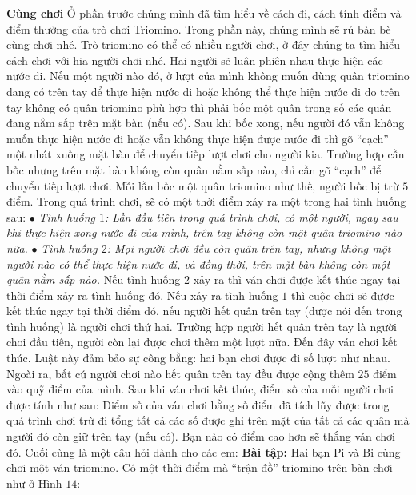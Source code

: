 	{\bf {Cùng chơi}}   
	\vskip 0.1cm
	Ở phần trước chúng mình đã tìm hiểu về cách đi, cách tính điểm và điểm thưởng của trò chơi Triomino. Trong phần  này, chúng mình sẽ rủ bàn bè cùng chơi nhé.
	\vskip 0.1cm
	Trò triomino có thể có nhiều người chơi, ở đây chúng ta tìm hiểu cách chơi với hia người chơi nhé. Hai người sẽ luân phiên nhau thực hiện các nước đi.
	\vskip 0.1cm
	Nếu một người nào đó, ở lượt của mình không muốn dùng quân triomino đang có trên tay để thực hiện nước đi hoặc không thể thực hiện nước đi do trên tay không có quân triomino phù hợp thì phải bốc một quân trong số các quân đang nằm sấp trên mặt bàn (nếu có). Sau khi bốc xong, nếu người đó vẫn không muốn thực hiện nước đi hoặc vẫn không thực hiện được nước đi thì gõ “cạch” một nhát xuống mặt bàn để chuyển tiếp lượt chơi cho người kia. Trường hợp cần bốc nhưng trên mặt bàn không còn quân nằm sấp nào, chỉ cần gõ “cạch” để chuyển tiếp lượt chơi. Mỗi lần bốc một quân triomino như thế, người bốc bị trừ $5$ điểm.
	\vskip 0.1cm
	Trong quá trình chơi, sẽ có một thời điểm xảy ra một trong hai tình huống sau:
	\vskip 0.1cm
	$\bullet$ \textit{Tình huống $1$: Lần đầu tiên trong quá trình chơi, có một người, ngay sau khi thực hiện xong nước đi của mình, trên tay không còn một quân triomino nào nữa.}
	\vskip 0.1cm
	$\bullet$ \textit{Tình huống $2$: Mọi người chơi đều còn quân trên tay, nhưng không một người nào có thể thực hiện nước đi, và đồng thời, trên mặt bàn không còn một quân nằm sấp nào.}
	\vskip 0.1cm
	Nếu tình huống $2$ xảy ra thì ván chơi được kết thúc ngay tại thời điểm xảy ra tình huống đó.
	\vskip 0.1cm
	Nếu xảy ra tình huống $1$ thì cuộc chơi sẽ được kết thúc ngay tại thời điểm đó, nếu người hết quân trên tay (được nói đến trong tình huống) là người chơi thứ hai. Trường hợp người hết quân trên tay là người chơi đầu tiên, người còn lại được chơi thêm một lượt  nữa. Đến đây ván chơi kết thúc. Luật này đảm bảo sự công bằng: hai bạn chơi được đi số lượt như nhau. Ngoài ra, bất cứ người chơi nào hết quân trên tay đều được cộng thêm $25$ điểm vào quỹ điểm của mình.
	\vskip 0.1cm
	Sau khi ván chơi kết thúc, điểm số của mỗi người chơi được tính như sau: Điểm số của ván chơi bằng số điểm đã tích lũy được trong quá trình chơi trừ đi tổng tất cả các số được ghi trên mặt của tất cả các quân mà người đó còn giữ trên tay (nếu có). Bạn nào có điểm cao hơn sẽ thắng ván chơi đó. 
	\vskip 0.1cm
	Cuối cùng là một câu hỏi dành cho các em:
	\vskip 0.3cm
	\textbf{Bài tập:} Hai bạn Pi và Bi cùng chơi một ván triomino. Có một thời điểm mà “trận đồ” triomino trên bàn chơi như ở Hình $14$:
	\vskip 0.1cm
